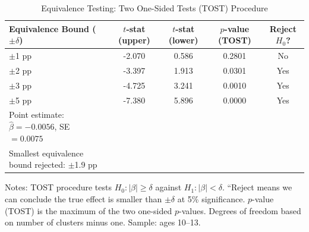 \begin{table}[H]
\centering
\caption{Equivalence Testing: Two One-Sided Tests (TOST) Procedure}
\label{tab:tost}
\begin{threeparttable}
\begin{tabular}{lcccc}
\toprule
Equivalence Bound ($\pm\delta$) & $t$-stat (upper) & $t$-stat (lower) & $p$-value (TOST) & Reject $H_0$? \\
\midrule
$\pm$1 pp & -2.070 & 0.586 & 0.2801 & No \\
$\pm$2 pp & -3.397 & 1.913 & 0.0301 & Yes \\
$\pm$3 pp & -4.725 & 3.241 & 0.0010 & Yes \\
$\pm$5 pp & -7.380 & 5.896 & 0.0000 & Yes \\
\midrule
Point estimate: $\hat{\beta} = -0.0056$, SE $= 0.0075$ & & & & \\
Smallest equivalence bound rejected: $\pm$1.9 pp & & & & \\
\bottomrule
\end{tabular}
\begin{tablenotes}
\footnotesize
\item Notes: TOST procedure tests $H_0: |\beta| \geq \delta$ against $H_1: |\beta| < \delta$. ``Reject means we can conclude the true effect is smaller than $\pm\delta$ at 5\% significance. $p$-value (TOST) is the maximum of the two one-sided $p$-values. Degrees of freedom based on number of clusters minus one. Sample: ages 10--13.
\end{tablenotes}
\end{threeparttable}
\end{table}